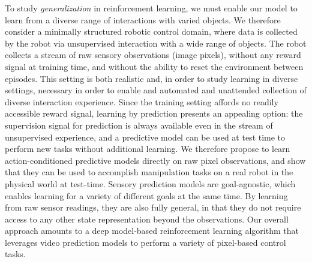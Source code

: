 To study \emph{generalization} in reinforcement learning, we must enable our model to learn from a diverse range of interactions with varied objects. We therefore consider a minimally structured robotic control domain, where data is collected by the robot via unsupervised interaction with a wide range of objects. The robot collects a stream of raw sensory observations (image pixels), without any reward signal at training time, and without the ability to reset the environment between episodes. This setting is both realistic and, in order to study learning in diverse settings, necessary in order to enable and automated and unattended collection of diverse interaction experience. Since the training setting affords no readily accessible reward signal, learning by prediction presents an appealing option: the supervision signal for prediction is always available even in the stream of unsupervised experience, and a predictive model can be used at test time to perform new tasks without additional learning.
We therefore propose to learn action-conditioned predictive models directly on raw pixel observations, and show that they can be used to accomplish manipulation tasks on a real robot in the physical world at test-time.
Sensory prediction models are goal-agnostic, which enables learning for a variety of different goals at the same time. By learning from raw sensor readings, they are also fully general, in that they do not require access to any other state representation beyond the observations.
Our overall approach amounts to a deep model-based reinforcement learning algorithm that leverages video prediction models to perform a variety of pixel-based control tasks.


